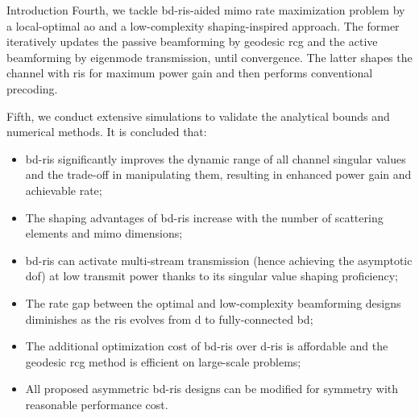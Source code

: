 \documentclass[journal]{IEEEtran}
\begin{document}
\begin{section}{Introduction}
		Fourth, we tackle \gls{bd}-\gls{ris}-aided \gls{mimo} rate maximization problem by a local-optimal \gls{ao} and a low-complexity shaping-inspired approach.
		The former iteratively updates the passive beamforming by geodesic \gls{rcg} and the active beamforming by eigenmode transmission, until convergence.
		The latter shapes the channel with \gls{ris} for maximum power gain and then performs conventional precoding.

		Fifth, we conduct extensive simulations to validate the analytical bounds and numerical methods.
		It is concluded that:
		\begin{itemize}
			\item \gls{bd}-\gls{ris} significantly improves the dynamic range of all channel singular values and the trade-off in manipulating them, resulting in enhanced power gain and achievable rate;
			\item The shaping advantages of \gls{bd}-\gls{ris} increase with the number of scattering elements and \gls{mimo} dimensions;
			\item \gls{bd}-\gls{ris} can activate multi-stream transmission (hence achieving the asymptotic \gls{dof}) at low transmit power thanks to its singular value shaping proficiency;
			\item The rate gap between the optimal and low-complexity beamforming designs diminishes as the \gls{ris} evolves from \gls{d} to fully-connected \gls{bd};
			\item The additional optimization cost of \gls{bd}-\gls{ris} over \gls{d}-\gls{ris} is affordable and the geodesic \gls{rcg} method is efficient on large-scale problems;
			\item All proposed asymmetric \gls{bd}-\gls{ris} designs can be modified for symmetry with reasonable performance cost.
		\end{itemize}


\end{section}
\end{document}
